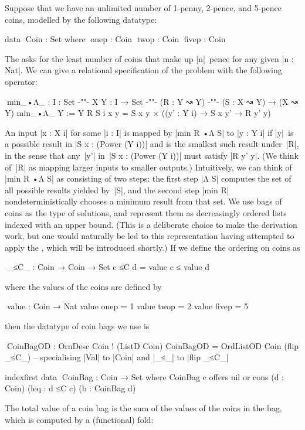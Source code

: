 Suppose that we have an unlimited number of 1-penny, 2-pence, and 5-pence coins, modelled by the following datatype:
\begin{code}
data ^^^Coin : Set where
  ^^^onep   : Coin
  ^^^twop   : Coin
  ^^^fivep  : Coin
\end{code}
The  asks for the least number of coins that make up |n|~pence for any given |n : Nat|.
We can give a relational specification of the problem with the following  operator:
\begin{code}
^^^min_•Λ_ : {I : Set} {-"\kern-1pt"-} {X Y : I → Set} {-"\kern-1pt"-} (R : Y ↝ Y) {-"\kern-1pt"-} (S : X ↝ Y) → (X ↝ Y)
min_•Λ_ {Y := Y} R S {i} x y = S x y × ((y' : Y i) → S x y' → R y' y)
\end{code}
An input |x : X i| for some |i : I| is mapped by |min R •Λ S| to |y : Y i| if |y|~is a possible result in |S x : (Power (Y i))| and is the smallest such result under~|R|, in the sense that any~|y'| in~|S x : (Power (Y i))| must satisfy |R y' y|.
(We think of~|R| as mapping larger inputs to smaller outputs.)
Intuitively, we can think of |min R •Λ S| as consisting of two steps: the first step |Λ S| computes the set of all possible results yielded by~|S|, and the second step |min R| nondeterministically chooses a minimum result from that set.
We use bags of coins as the type of solutions, and represent them as decreasingly ordered lists indexed with an upper bound.
(This is a deliberate choice to make the derivation work, but one would naturally be led to this representation having attempted to apply the , which will be introduced shortly.)
If we define the ordering on coins as
\begin{code}
^^^_≤C_ : Coin → Coin → Set
c ≤C d = value c ≤ value d
\end{code}
where the values of the coins are defined by
\begin{code}
^^^value : Coin → Nat
value  onep   =  1
value  twop   =  2
value  fivep  =  5
\end{code}
then the datatype of coin bags we use is
\begin{code}
^^^CoinBagOD : OrnDesc Coin ! (ListD Coin)
CoinBagOD = OrdListOD Coin (flip _≤C_)
-- specialising |Val| to |Coin| and |_≤_| to |flip _≤C_|

indexfirst data ^^^CoinBag : Coin → Set where
  CoinBag c  offers  nil
             or      cons  (d : Coin) (leq : d ≤C c) (b : CoinBag d)
\end{code}
The total value of a coin bag is the sum of the values of the coins in the bag, which is computed by a (functional) fold:
